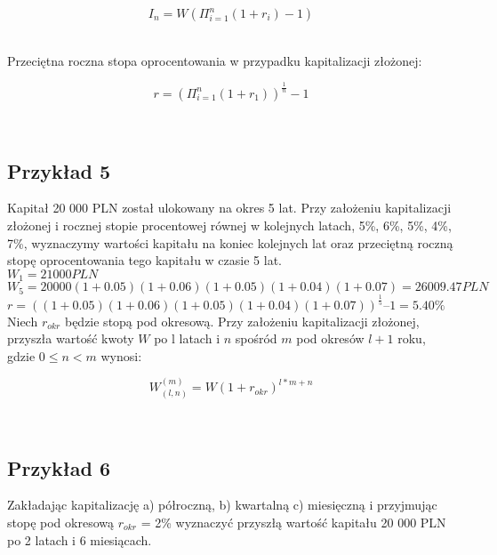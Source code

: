 \documentclass{article}
\begin{document}
\begin{center}
	\begin{equation}
		I_n = W(\Pi^n_{i=1}(1 + r_i) - 1)
	\end{equation}
\end{center}\\

Przeciętna roczna stopa oprocentowania w przypadku kapitalizacji złożonej:\\

\begin{center}
	\begin{equation}
		r = (\Pi^n_{i=1}(1 + r_1))^{\frac{1}{n}} - 1
	\end{equation}
\end{center}\\

\subsection{Przykład 5}
Kapitał 20 000 PLN został ulokowany na okres 5 lat. Przy założeniu kapitalizacji złożonej i rocznej stopie procentowej równej w kolejnych latach, 5\%, 6\%, 5\%, 4\%, 7\%, wyznaczymy wartości kapitału na koniec kolejnych lat oraz przeciętną roczną stopę oprocentowania tego kapitału w czasie 5 lat. \\

$ W_1 = 21 000 PLN $\\

$ W_5 = 20 000(1+0.05)(1+0.06)(1+0.05)(1+0.04)(1+0.07) = 26 009.47 PLN $ \\

$ r = ((1+0.05)(1+0.06)(1+0.05)(1+0.04)(1+0.07))^{\frac{1}{5}} – 1 = 5.40\% $\\

Niech $ r_{okr} $ będzie stopą pod okresową. Przy założeniu kapitalizacji złożonej, przyszła wartość kwoty $ W $ po l latach i $ n $ spośród $ m $ pod okresów $ l+1 $ roku, gdzie $ 0 \leq n < m $ wynosi:

\begin{center}
	\begin{equation}
		W^{(m)}_{(l, n)} = W(1 + r_{okr})^{l * m + n}
	\end{equation}
\end{center}\\

\subsection{Przykład 6}
Zakładając kapitalizację a) półroczną, b) kwartalną c) miesięczną i przyjmując stopę pod okresową $ r_{okr} $ = 2\% wyznaczyć przyszłą wartość kapitału 20 000 PLN po 2 latach i 6 miesiącach.
\end{document}
